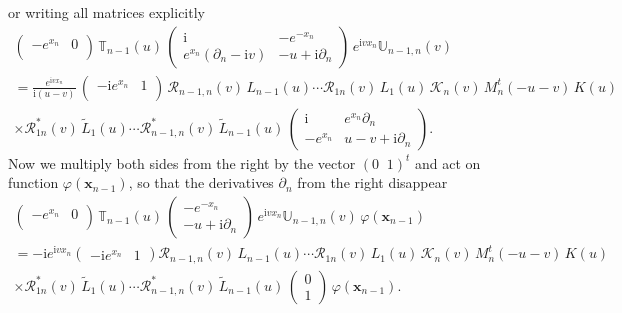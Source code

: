 \documentclass[11pt]{article}
\numberwithin{equation}{section}
\theoremstyle{plain}
\theoremstyle{definition}
\newcommand{\T}{\mathbb{T}}
\newcommand{\MMO}{\mathbb{U}}
\renewcommand{\phi}{\varphi}
\renewcommand{\imath}{\mathrm{i}}
\begin{document}
or writing all matrices explicitly
\begin{multline}
\begin{pmatrix}
-e^{x_n} & 0 \\
	\end{pmatrix}\,\T_{n-1}(u)\,
\begin{pmatrix}
\imath & -e^{-x_n} \\[4pt]
e^{x_n}(\partial_n -\imath v) & -u + \imath \partial_n 
\end{pmatrix} 
\, e^{\imath v x_n}\MMO_{n-1, n}(v) \\[6pt]
= \frac{e^{\imath v x_n}}{\imath (u-v)}\,
\begin{pmatrix}
-\imath e^{x_n} & 1 \\
	\end{pmatrix}\,\mathcal{R}_{n-1, n}(v) \, L_{n-1}(u) \cdots 
\mathcal{R}_{1 n}(v) \, L_1(u)\, 
\mathcal{K}_n(v)\,M^t_n(-u-v)\,K(u) \\[3pt] 
\times \mathcal{R}^*_{1 n}(v) \, \widetilde{L}_{1}(u) \cdots 
\mathcal{R}^*_{n-1, n}(v) \, \widetilde{L}_{n-1}(u)\, 
\begin{pmatrix}
\imath  & e^{x_n}\partial_n \\[4pt]
-e^{x_n} & u-v+\imath \partial_n 
\end{pmatrix} .
\end{multline}
Now we multiply both sides from the right by the vector $(0 \;\; 1)^t$ and act on function $\phi(\bm{x}_{n - 1})$, so that the derivatives $\partial_n$ from the right disappear
\begin{multline} \label{DL-RLK}
\begin{pmatrix}
-e^{x_n} & 0 \\
	\end{pmatrix}\,\T_{n-1}(u)\,
\begin{pmatrix}
-e^{-x_n} \\[4pt] 
-u + \imath \partial_n 
\end{pmatrix} 
\, e^{\imath v x_n}\MMO_{n-1, n}(v)\,\phi(\bm{x}_{n-1}) \\[6pt]
= - \imath e^{\imath v x_n}
\begin{pmatrix}
-\imath e^{x_n} & 1 
	\end{pmatrix}
\mathcal{R}_{n-1,n}(v) \, L_{n-1}(u) \cdots 
\mathcal{R}_{1 n}(v) \, L_1(u)\, 
\mathcal{K}_n(v)\,M^t_n(-u-v)\,K(u) \\[6pt] 
\times \mathcal{R}^*_{1 n}(v) \, \widetilde{L}_{1}(u) \cdots 
\mathcal{R}^*_{n-1,n}(v) \, \widetilde{L}_{n-1}(u)\, 
\begin{pmatrix}
0 \\
1
\end{pmatrix}\,\phi(\bm{x}_{n-1}).
\end{multline}
\end{document}
